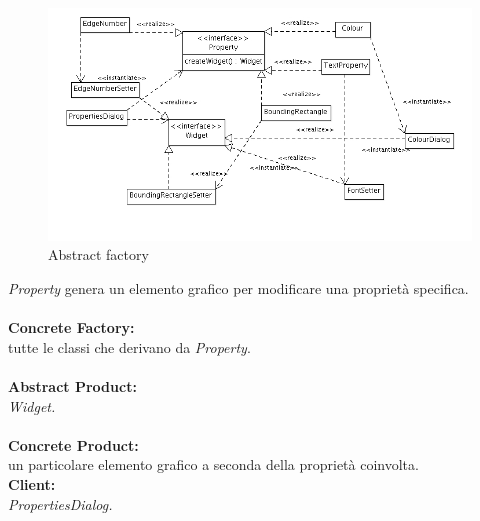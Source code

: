 \begin{figure}[!ht]
\centering
\includegraphics{absfactory.jpg}
\caption{Abstract factory}
\end{figure}
\textit{Property} genera un elemento grafico per modificare una propriet\`a specifica.\\ \\
\textbf{Concrete Factory: }\\
tutte le classi che derivano da \textit{Property}. \\ \\
\textbf{Abstract Product: }\\
\textit{Widget.}\\ \\
\textbf{Concrete Product: }\\
un particolare elemento grafico a seconda della propriet\`a coinvolta. \\
\textbf{Client:}\\
\textit{PropertiesDialog.}
\newpage

